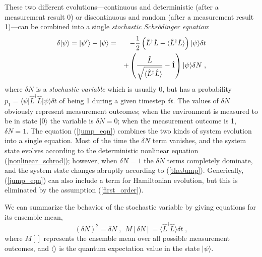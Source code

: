\documentclass[12pt]{article}
\def\bra#1{{\langle #1 |}}
\def\ket#1{{| #1 \rangle}}
\def\expect#1{{\langle #1 \rangle}}
\def\id{{\hat 1}}
\def\L{{\hat L}}
\def\Ldag{{\hat L^\dagger}}
\begin{document}
These two different evolutions---continuous and deterministic (after
a measurement result 0) or discontinuous and random (after a
measurement result 1)---can be combined into a single {\it stochastic
Schr\"odinger equation}:
\begin{eqnarray}
\delta\ket\psi = \ket{\psi'} - \ket\psi &=&
  - {1\over2}\left(\Ldag\L - \expect{\Ldag\L}\right) \ket\psi \delta t
  \nonumber\\
&& + \left( {\L\over \sqrt{\expect{\Ldag\L}}}
  - \id \right)\ket\psi \delta N \;,
\label{jump_eqn}
\end{eqnarray}
where $\delta N$ is a {\it stochastic variable} which is usually 0,
but has a probability $p_1 = \bra\psi\Ldag\L\ket\psi\delta t$
of being 1 during a given timestep $\delta t$.
The values of $\delta N$ obviously represent
measurement outcomes; when the environment is measured to be in state
$\ket0$ the variable is $\delta N=0$; when the measurement outcome is 1,
$\delta N=1$.  The equation (\ref{jump_eqn}) combines the two kinds of
system evolution into a single equation.  Most of the time the $\delta N$
term vanishes, and the system state evolves according to the
deterministic nonlinear equation (\ref{nonlinear_schrod}); however, when
$\delta N=1$ the $\delta N$ terms completely dominate, and the system state
changes abruptly according to (\ref{theJump}).  Generically, (\ref{jump_eqn})
can also include a term for Hamiltonian evolution, but this is
eliminated by the assumption (\ref{first_order}).

We can summarize the behavior of the stochastic variable by giving
equations for its ensemble mean,
\begin{equation}
(\delta N)^2 = \delta N \;, \ \ M[\delta N] = \expect{\Ldag\L}\delta t \;,
\end{equation}
where $M[]$ represents the ensemble mean over all possible measurement
outcomes, and $\expect{}$ is the quantum expectation value in the state
$\ket\psi$.
\end{document}
